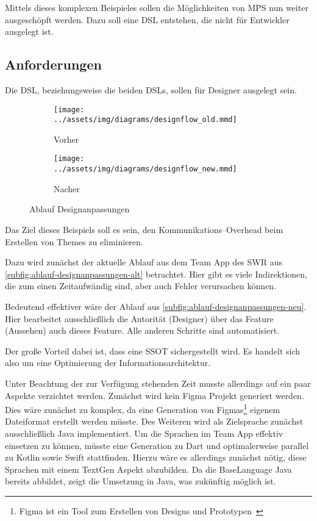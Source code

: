 Mittels dieses komplexen Beispieles sollen die Möglichkeiten von \ac{MPS} nun weiter ausgeschöpft werden.
Dazu soll eine \ac{DSL} entstehen, die nicht für Entwickler ausgelegt ist.

\subsection{Anforderungen}\label{subsec:anforderungen}
Die \ac{DSL}, beziehungsweise die beiden \acp{DSL}, sollen für Designer ausgelegt sein.
\begin{figure}[ht]
    \begin{subfigure}[c]{0.5\textwidth}
        \begin{center}
            \texttt{[image: ../assets/img/diagrams/designflow\_old.mmd]}
        \end{center}
        \caption{Vorher}
        \label{subfig:ablauf-designanpassungen-alt}
    \end{subfigure}
    \begin{subfigure}[c]{0.5\textwidth}
        \begin{center}
            \texttt{[image: ../assets/img/diagrams/designflow\_new.mmd]}
        \end{center}
        \caption{Nacher}
        \label{subfig:ablauf-designanpassungen-neu}
    \end{subfigure}
    \caption{Ablauf Designanpassungen}
    \label{fig:ablauf-designanpassungen}
\end{figure}
Das Ziel dieses Beispiels soll es sein, den Kommunikations--Overhead beim Erstellen von Themes zu eliminieren.

Dazu wird zunächst der aktuelle Ablauf aus dem Team App des \ac{SWR} aus \autoref{subfig:ablauf-designanpassungen-alt} betrachtet.
Hier gibt es viele Indirektionen, die zum einen Zeitaufwändig sind, aber auch Fehler verursachen können.

Bedeutend effektiver wäre der Ablauf aus \autoref{subfig:ablauf-designanpassungen-neu}.
Hier bearbeitet ausschließlich die Autorität (Designer) über das Feature (Aussehen) auch dieses Feature.
Alle anderen Schritte sind automatisiert.

Der große Vorteil dabei ist, dass eine \ac{SSOT} sichergestellt wird.
Es handelt sich also um eine Optimierung der Informationsarchitektur.

Unter Beachtung der zur Verfügung stehenden Zeit musste allerdings auf ein paar Aspekte verzichtet werden.
Zunächst wird kein Figma Projekt generiert werden.
Dies wäre zunächst zu komplex, da eine Generation von Figmas\footnote{Figma ist ein Tool zum Erstellen von Designs und Prototypen~\autocite{figma-inc-no-date}} eigenem Dateiformat erstellt werden müsste.
Des Weiteren wird als Zielsprache zunächst ausschließlich Java implementiert.
Um die Sprachen im Team App effektiv einsetzen zu können, müsste eine Generation zu Dart und optimalerweise parallel zu Kotlin sowie Swift stattfinden.
Hierzu wäre es allerdings zunächst nötig, diese Sprachen mit einem TextGen Aspekt abzubilden.
Da die BaseLanguage Java bereits abbildet, zeigt die Umsetzung in Java, was zukünftig möglich ist.

